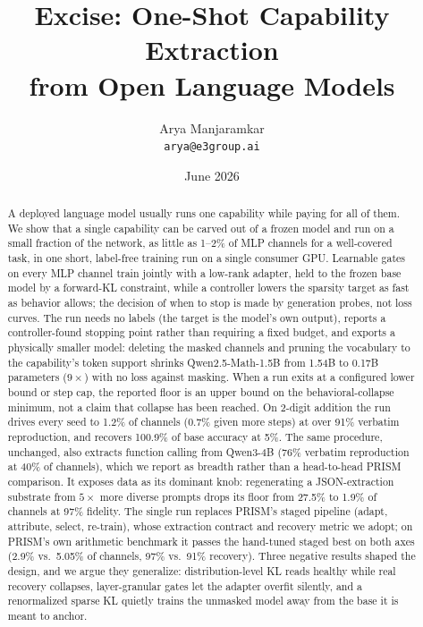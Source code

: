 \documentclass{article}
\title{Excise: One-Shot Capability Extraction \\ from Open Language Models}
\author{
  Arya Manjaramkar \\
  \texttt{arya@e3group.ai}
}
\date{June 2026}
\begin{document}
\maketitle

\begin{abstract}
A deployed language model usually runs one capability while paying for all of
them. We show that a single capability can be carved out of a frozen model and
run on a small fraction of the network, as little as 1--2\% of MLP channels
for a well-covered task, in one short, label-free training run on a single
consumer GPU. Learnable gates on every MLP channel train jointly with a
low-rank adapter, held to the frozen base model by a forward-KL constraint,
while a controller lowers the sparsity target as fast as behavior allows; the
decision of when to stop is made by generation probes, not loss curves. The
run needs no labels (the target is the model's own output), reports a
controller-found stopping point rather than requiring a fixed budget, and
exports a physically smaller model: deleting the masked channels and pruning
the vocabulary to the capability's token support shrinks
Qwen2.5-Math-1.5B from 1.54B to 0.17B parameters ($9\times$) with no loss
against masking. When a run exits at a configured lower bound or step cap, the
reported floor is an upper bound on the behavioral-collapse minimum, not a
claim that collapse has been reached. On 2-digit addition the run drives every
seed to 1.2\% of channels (0.7\% given more steps) at over 91\% verbatim
reproduction, and recovers 100.9\% of base accuracy at 5\%. The same
procedure, unchanged, also extracts function calling from Qwen3-4B (76\%
verbatim reproduction at 40\% of channels), which we report as breadth rather
than a head-to-head PRISM comparison. It exposes data as its dominant knob:
regenerating a JSON-extraction substrate from $5\times$ more diverse prompts
drops its floor from 27.5\% to 1.9\% of channels at 97\% fidelity. The single
run replaces PRISM's staged pipeline (adapt, attribute, select, re-train),
whose extraction contract and recovery metric we adopt; on PRISM's own
arithmetic benchmark it passes the hand-tuned staged best on both axes (2.9\%
vs.\ 5.05\% of channels, 97\% vs.\ 91\% recovery). Three negative results
shaped the design, and we argue they generalize: distribution-level KL reads
healthy while real recovery collapses, layer-granular gates let the adapter
overfit silently, and a renormalized sparse KL quietly trains the unmasked
model away from the base it is meant to anchor.
\end{abstract}
\end{document}
